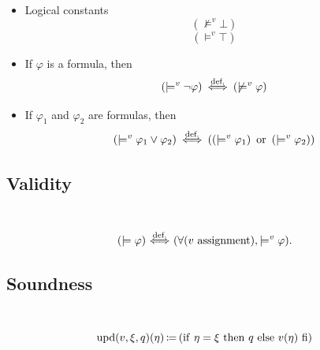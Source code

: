 \begin{definition}

\fi %
\begin{itemize}
\item Logical constants
\[
\left(\not\models^v \bot\right)
\]%
\[
\left(\models^v \top\right) 
\]%
\item If $\varphi$ is a formula, then
\[
\left(\models^v \neg \varphi \right)
\ {\stackrel{{\textrm{def.}}}{\Longleftrightarrow}}\  
\left(\not\models^v \varphi\right)
\]%
\item If $\varphi_1$ and $\varphi_2$ are formulas, then
\[
\left(\models^v \varphi_1\lor\varphi_2 \right)
\ {\stackrel{{\textrm{def.}}}{\Longleftrightarrow}}\  
\left(
\left(\models^v \varphi_1\right)
\text{\ or\ }
\left(\models^v \varphi_2\right)
\right)
\]%
\end{itemize}
\subsection{Validity}
\end{definition}
\begin{definition}[validity]\ %
\[
(\models \varphi) \ {\stackrel{{\textrm{def.}}}{\Longleftrightarrow}}\  (\forall(v\mathrm{\ assignment}), \models^v \varphi).
\]%
\end{definition}
\subsection{Soundness}
\begin{definition}\ %
\[
\upd(v,\xi,q)(\eta)\ceq (\lif\ \eta=\xi\ \lthen\ q\ \lelse\ v(\eta)\ \lfi)
\]
\end{definition}

